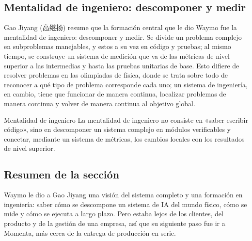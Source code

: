\subsection{Mentalidad de ingeniero: descomponer y medir}

Gao Jiyang (高继扬) resume que la formación central que le dio Waymo fue la mentalidad de ingeniero: descomponer y medir. Se divide un problema complejo en subproblemas manejables, y estos a su vez en código y pruebas; al mismo tiempo, se construye un sistema de medición que va de las métricas de nivel superior a las intermedias y hasta las pruebas unitarias de base. Esto difiere de resolver problemas en las olimpiadas de física, donde se trata sobre todo de reconocer a qué tipo de problema corresponde cada uno; un sistema de ingeniería, en cambio, tiene que funcionar de manera continua, localizar problemas de manera continua y volver de manera continua al objetivo global.

\begin{importantbox}{Mentalidad de ingeniero}
La mentalidad de ingeniero no consiste en «saber escribir código», sino en descomponer un sistema complejo en módulos verificables y conectar, mediante un sistema de métricas, los cambios locales con los resultados de nivel superior.
\end{importantbox}

\subsection{Resumen de la sección}

Waymo le dio a Gao Jiyang una visión del sistema completo y una formación en ingeniería: saber cómo se descompone un sistema de IA del mundo físico, cómo se mide y cómo se ejecuta a largo plazo. Pero estaba lejos de los clientes, del producto y de la gestión de una empresa, así que su siguiente paso fue ir a Momenta, más cerca de la entrega de producción en serie.
